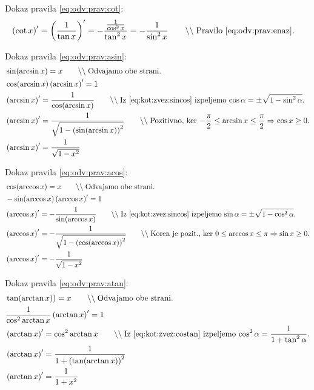 \documentclass[a4paper,oneside,12pt,fleqn]{article}
\newcommand{\comment}[1]{\ensuremath{\qquad\backslash\backslash\;}\textnormal{#1}}
\def\kos{\cos}
\renewcommand\implies\Rightarrow
\numberwithin{equation}{section}
\begin{document}
Dokaz pravila \eqref{eq:odv:prav:cot}:
\begin{align*}
  \left( \cot x \right)' &= \left( \frac{1}{\tan x} \right)' =
  -\frac{\frac{1}{\kos^2x}}{\tan^2x} = -\frac{1}{\sin^2x} \comment{Pravilo
  \eqref{eq:odv:prav:enaz}.}
\end{align*}

Dokaz pravila \eqref{eq:odv:prav:asin}:
\begin{align*}
  & \sin(\arcsin x) = x \comment{Odvajamo obe strani.} \\
  & \kos(\arcsin x)\left( \arcsin x \right)' = 1 \\
  & \left( \arcsin x \right)' = \frac{1}{\kos(\arcsin x)} \comment{Iz
  \eqref{eq:kot:zvez:sincos} izpeljemo $\kos\alpha = \pm\sqrt{1-\sin^2\alpha}$.} \\
  & \left( \arcsin x \right)' = \frac{1}{\sqrt{1-\left( \sin(\arcsin x) \right)^2}} \comment{Pozitivno, ker
  $-\frac{\pi}{2} \le \arcsin x \le \frac{\pi}{2} \implies \kos x \ge 0$.} \\
  & \left( \arcsin x \right)' = \frac{1}{\sqrt{1-x^2}}
\end{align*}

Dokaz pravila \eqref{eq:odv:prav:acos}:
\begin{align*}
  & \kos(\arccos x) = x \comment{Odvajamo obe strani.} \\
  & -\sin(\arccos x)\left( \arccos x\right)' = 1 \\
  & \left( \arccos x\right)' = -\frac{1}{\sin(\arccos x)} \comment{Iz
  \eqref{eq:kot:zvez:sincos} izpeljemo $\sin\alpha = \pm\sqrt{1-\kos^2\alpha}$.} \\
  & \left( \arccos x \right)' = -\frac{1}{\sqrt{1-\left( \kos(\arccos x) \right)^2}}
  \comment{Koren je pozit., ker $ 0 \le \arccos x \le \pi \implies \sin x \ge 0$.} \\
  & \left( \arccos x \right)' = -\frac{1}{\sqrt{1-x^2}}
\end{align*}

Dokaz pravila \eqref{eq:odv:prav:atan}:
\begin{align*}
  & \tan(\arctan x)) = x \comment{Odvajamo obe strani.} \\
  & \frac{1}{\kos^2\arctan x}\left( \arctan x \right)' = 1 \\
  & \left( \arctan x \right)' = \kos^2\arctan x \comment{Iz \eqref{eq:kot:zvez:costan}
  izpeljemo $\kos^2\alpha = \frac{1}{1 + \tan^2\alpha}$.} \\
  & \left( \arctan x \right)' = \frac{1}{1 + \left( \tan(\arctan x) \right)^2}\\
  &  \left( \arctan x \right)' = \frac{1}{1 + x^2}
\end{align*}
\end{document}
